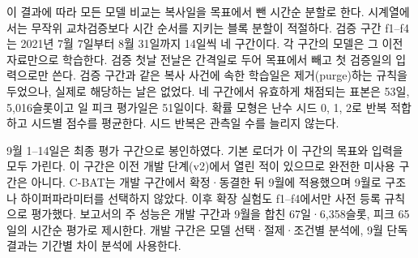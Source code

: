이 결과에 따라 모든 모델 비교는 복사일을 목표에서 뺀 시간순 분할로 한다. 시계열에서는 무작위 교차검증보다 시간 순서를 지키는 블록 분할이 적절하다\citep{roberts2017blockcv,bergmeir2018cv}. 검증 구간 f1--f4는 2021년 7월 7일부터 8월 31일까지 14일씩 네 구간이다. 각 구간의 모델은 그 이전 자료만으로 학습한다. 검증 첫날 전날은 간격일로 두어 목표에서 빼고 첫 검증일의 입력으로만 쓴다. 검증 구간과 같은 복사 사건에 속한 학습일은 제거(purge)하는 규칙을 두었으나, 실제로 해당하는 날은 없었다. 네 구간에서 유효하게 채점되는 표본은 53일, 5,016슬롯이고 일 피크 평가일은 51일이다. 확률 모형은 난수 시드 0, 1, 2로 반복 적합하고 시드별 점수를 평균한다. 시드 반복은 관측일 수를 늘리지 않는다.

9월 1--14일은 최종 평가 구간으로 봉인하였다. 기본 로더가 이 구간의 목표와 입력을 모두 가린다. 이 구간은 이전 개발 단계(v2)에서 열린 적이 있으므로 완전한 미사용 구간은 아니다. C-BAT는 개발 구간에서 확정·동결한 뒤 9월에 적용했으며 9월로 구조나 하이퍼파라미터를 선택하지 않았다. 이후 확장 실험도 f1--f4에서만 사전 등록 규칙으로 평가했다. 보고서의 주 성능은 개발 구간과 9월을 합친 67일·6,358슬롯, 피크 65일의 시간순 평가로 제시한다. 개발 구간은 모델 선택·절제·조건별 분석에, 9월 단독 결과는 기간별 차이 분석에 사용한다.
